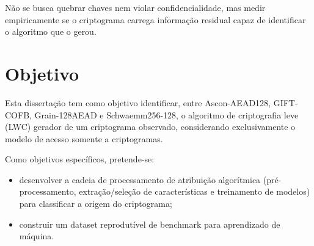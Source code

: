 Não se busca quebrar chaves nem violar confidencialidade, mas medir
empiricamente se o criptograma carrega informação residual capaz de identificar
o algoritmo que o gerou.

\section{Objetivo}

Esta dissertação tem como objetivo identificar, entre Ascon-AEAD128, GIFT-COFB, Grain-128AEAD e Schwaemm256-128, o algoritmo de criptografia leve (LWC) gerador de um criptograma observado, considerando exclusivamente o modelo de acesso somente a criptogramas.

Como objetivos específicos, pretende-se:
\begin{itemize}
    \item desenvolver a cadeia de processamento de atribuição algorítmica
    (pré-processamento, extração/seleção de características e treinamento de
    modelos) para classificar a origem do criptograma;
    \item construir um dataset reprodutível de benchmark para aprendizado de
    máquina.
\end{itemize}